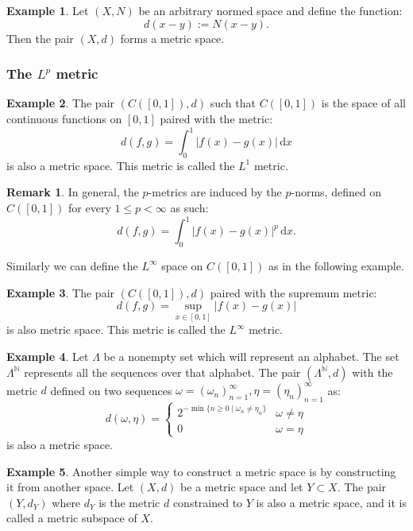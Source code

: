 \documentclass[11pt,a4paper]{article}
\theoremstyle{definition}
\newtheorem{remark}{Remark}[section]
\newtheorem{example}{Example}[section]
\theoremstyle{plain}
\newcommand\dx    {\,\mathrm{d}x}
\newcommand{\N}{\mathbb{N}}
\newcommand{\abs}[1]{\left\lvert #1\right\rvert}
\begin{document}
  \begin{example}
  Let $(X, N)$ be an arbitrary normed space and define the function:
  \[
    d(x - y) := N(x - y).
  \] 
  Then the pair $(X, d)$ forms a metric space.
  \end{example}

  \subsubsection{The \texorpdfstring{$L^p$}{} metric}

  \begin{example}
  The pair $(C\left([0,1]\right), d)$ such that $C([0,1])$ is the space of 
  all continuous functions on $[0,1]$ paired with the metric:
  \[
    d(f,g) = \int_{0}^{1}{\abs{f(x) - g(x)}\dx}
  \]
  is also a metric space. This metric is called the $L^1$ metric.
  \end{example}
  
  \begin{remark}
    In general, the $p$-metrics are induced by the $p$-norms, defined
    on $C\left([0,1]\right)$ for every $1 \le p < \infty$ as such:
    \[
      d(f,g) = \int_{0}^{1}{\abs{f(x) - g(x)}^p}\dx.
    \]
  \end{remark}
  Similarly we can define the $L^\infty$ space on $C\left([0,1]\right)$
  as in the following example.
  \begin{example}
  The pair $(C([0,1]), d)$ paired with the supremum metric:
  \[
    d(f,g) = \sup_{x \in [0,1]}{\abs{f(x) - g(x)}}
  \]
  is also metric space. This metric is called the $L^\infty$ metric.
  \end{example}
  
  \begin{example}
  Let $\Lambda$ be a nonempty set which will represent an alphabet.
  The set $\Lambda^{\N}$ represents all the sequences over that alphabet.
  The pair $(\Lambda^\N, d)$ with the metric $d$ defined on two sequences
  $\omega = (\omega_n)_{n=1}^{\infty}, \eta = (\eta_n)_{n=1}^{\infty}$
  as:
  \[
    d(\omega, \eta) = \begin{cases}
      2^{-\min\{n \geq 0 \mid \omega_n \neq \eta_n\}} & 
      \omega \neq \eta \\
      0 & \omega = \eta
    \end{cases}
  \]
  is also a metric space.
  \end{example}
  \begin{example}
    Another simple way to construct a metric space is by constructing it
    from another space. Let $(X,d)$ be a metric space and let $Y \subset X$.
    The pair $(Y,d_Y)$ where $d_Y$ is the metric $d$ constrained to $Y$
    is also a metric space, and it is called a metric subspace of $X$.
  \end{example}
\end{document}
